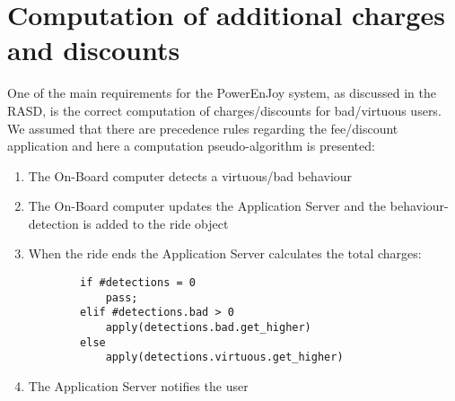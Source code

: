 \section{Computation of additional charges and discounts}
One of the main requirements for the PowerEnJoy system, as discussed in the RASD, is the correct computation of charges/discounts for bad/virtuous users.
\\We assumed that there are precedence rules regarding the fee/discount application and here a computation pseudo-algorithm is presented:

\begin{enumerate}
	\item The On-Board computer detects a virtuous/bad behaviour
	\item The On-Board computer updates the Application Server and the behaviour-detection is added to the ride object
	\item When the ride ends the Application Server calculates the total charges:
	\begin{lstlisting}
		if #detections = 0 
			pass;
		elif #detections.bad > 0
			apply(detections.bad.get_higher)
		else
			apply(detections.virtuous.get_higher)
	\end{lstlisting}
	\item The Application Server notifies the user
\end{enumerate}